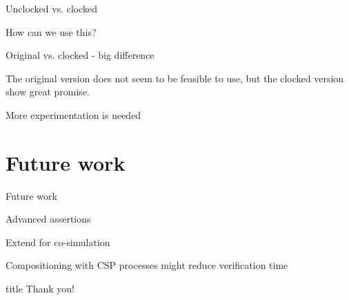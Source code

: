 \documentclass[11pt]{beamer}
\begin{document}
\begin{frame}{Unclocked vs. clocked}
\end{frame}
%
\begin{frame}{How can we use this?}

\begin{block}{}
Original vs. clocked - big difference
\end{block}

\pause

\begin{block}{}
The original version does not seem to be feasible to use, but the clocked version show great promise.
\end{block}

\pause

\begin{block}{}
More experimentation is needed
\end{block}

\end{frame}


\section{Future work}
%
\begin{frame}{Future work}

\begin{block}{}
Advanced assertions
\end{block}

\pause

\begin{block}{}
Extend for co-simulation
\end{block}

\pause

\begin{block}{}
Compositioning with CSP processes might reduce verification time
\end{block}


\end{frame}

%
  \begin{frame}
  \vfill
  \centering
  \begin{beamercolorbox}[sep=8pt,center,shadow=true,rounded=true]{title}
    Thank you!\par%
  \end{beamercolorbox}
  \vfill
  \end{frame}
\end{document}
